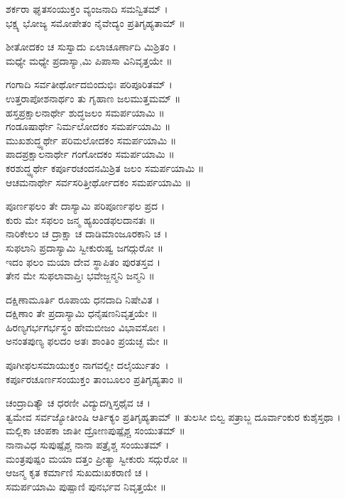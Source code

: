 ಶರ್ಕರಾ ಘೃತಸಂಯುಕ್ತಂ ವ್ಯಂಜನಾದಿ ಸಮನ್ವಿತಮ್ ।\\
ಭಕ್ಷ್ಯ ಭೋಜ್ಯ ಸಮೋಪೇತಂ ನೈವೇದ್ಯಂ ಪ್ರತಿಗೃಹ್ಯತಾಮ್ ॥

ಶೀತೋದಕಂ ಚ ಸುಸ್ವಾದು ಏಲಾಚೂರ್ಣಾದಿ ಮಿಶ್ರಿತಂ ।\\
ಮಧ್ಯೇ ಮಧ್ಯೇ ಪ್ರದಾಸ್ಯಾ,ಮಿ ಪಿಪಾಸಾ ವಿನಿವೃತ್ತಯೇ ॥

ಗಂಗಾದಿ ಸರ್ವತೀರ್ಥೋದಬಿಂದುಭಿಃ ಪರಿಪೂರಿತಮ್ ।\\
ಉತ್ತರಾಪೋಶನಾರ್ಥಂ ತು ಗೃಹಾಣ ಜಲಮುತ್ತಮಮ್ ॥\\
\newpage
ಹಸ್ತಪ್ರಕ್ಷಾಲನಾರ್ಥೇ ಶುದ್ಧಜಲಂ ಸಮರ್ಪಯಾಮಿ ॥\\
ಗಂಡೂಷಾರ್ಥೇ ನಿರ್ಮಲೋದಕಂ ಸಮರ್ಪಯಾಮಿ ॥\\
ಮುಖಶುದ್ಧ್ಯರ್ಥೇ ಪರಿಮಲೋದಕಂ ಸಮರ್ಪಯಾಮಿ ॥\\
ಪಾದಪ್ರಕ್ಷಾಲನಾರ್ಥೇ ಗಂಗೋದಕಂ ಸಮರ್ಪಯಾಮಿ ॥\\
ಕರಶುದ್ಧ್ಯರ್ಥೇ ಕರ್ಪೂರಚಂದನಮಿಶ್ರಿತ ಜಲಂ ಸಮರ್ಪಯಾಮಿ ॥\\
ಆಚಮನಾರ್ಥೇ ಸರ್ವಸರಿತ್ತೀರ್ಥೋದಕಂ ಸಮರ್ಪಯಾಮಿ ॥

ಪೂರ್ಣಫಲಂ ತೇ ದಾಸ್ಯಾಮಿ ಪರಿಪೂರ್ಣಫಲ ಪ್ರದ ।\\
ಕುರು ಮೇ ಸಫಲಂ ಜನ್ಮ ಹ್ಯಖಂಡಫಲದಾನತಃ ॥\\
ನಾರಿಕೇಲಂ ಚ ದ್ರಾಕ್ಷಾ ಚ ದಾಡಿಮಾಂಜೂರಕಾನಿ ಚ ।\\
ಸುಫಲಾನಿ ಪ್ರದಾಸ್ಯಾಮಿ ಸ್ವೀಕುರುಷ್ವ ಜಗದ್ಗುರೋ ॥\\
ಇದಂ ಫಲಂ ಮಯಾ ದೇವ ಸ್ಥಾಪಿತಂ ಪುರತಸ್ತವ ।\\
ತೇನ ಮೇ ಸುಫಲಾವಾಪ್ತಿಃ ಭವೇಜ್ಜನ್ಮನಿ ಜನ್ಮನಿ ॥

ದಕ್ಷಿಣಾಮೂರ್ತಿ ರೂಪಾಯ ಧನದಾದಿ ನಿಷೇವಿತ ।\\
ದಕ್ಷಿಣಾಂ ತೇ ಪ್ರದಾಸ್ಯಾಮಿ ಧನೈಷಣನಿವೃತ್ತಯೇ ॥\\
ಹಿರಣ್ಯಗರ್ಭಗರ್ಭಸ್ಥಂ ಹೇಮಬೀಜಂ ವಿಭಾವಸೋಃ ।\\
ಅನಂತಪುಣ್ಯ ಫಲದಂ ಅತಃ ಶಾಂತಿಂ ಪ್ರಯಚ್ಛ ಮೇ ॥

ಪೂಗೀಫಲಸಮಾಯುಕ್ತಂ ನಾಗವಲ್ಲೀ ದಲೈರ್ಯುತಂ~।\\
ಕರ್ಪೂರಚೂರ್ಣಸಂಯುಕ್ತಂ ತಾಂಬೂಲಂ ಪ್ರತಿಗೃಹ್ಯತಾಂ ॥

ಚಂದ್ರಾದಿತ್ಯೌ ಚ ಧರಣೀ ವಿದ್ಯುದಗ್ನಿಸ್ತಥೈವ ಚ ।\\
ತ್ವಮೇವ ಸರ್ವಜ್ಯೋತೀಂಷಿ ಆರ್ತಿಕ್ಯಂ ಪ್ರತಿಗೃಹ್ಯತಾಮ್ ॥
\newpage
ತುಲಸೀ ಬಿಲ್ವ ಪತ್ರಾಬ್ಜ ದೂರ್ವಾಂಕುರ ಕುಶೈಸ್ತಥಾ ।\\
ಮಲ್ಲಿಕಾ ಚಂಪಕಾ ಜಾತೀ ದ್ರೋಣಪುಷ್ಪೈಶ್ಚ ಸಂಯುತಮ್ ॥\\
ನಾನಾವಿಧ ಸುಪುಷ್ಪೈಶ್ಚ ನಾನಾ ಪತ್ರೈಶ್ಚ ಸಂಯುತಮ್ ।\\
ಮಂತ್ರಪುಷ್ಪಂ ಮಯಾ ದತ್ತಂ ಪ್ರೀತ್ಯಾ ಸ್ವೀಕುರು ಸದ್ಗುರೋ ॥\\
ಆಜನ್ಮ ಕೃತ ಕರ್ಮಾಣಿ ಸುಖದುಃಖಕರಾಣಿ ಚ ।\\
ಸಮರ್ಪಯಾಮಿ ಪುಷ್ಪಾಣಿ ಪುನರ್ಭವ ನಿವೃತ್ತಯೇ ॥


